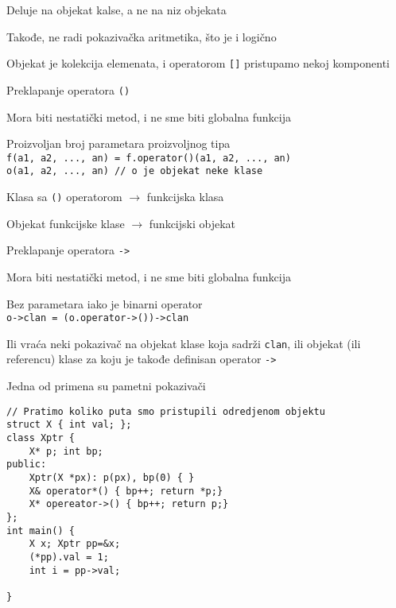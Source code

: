 \documentclass{article}
\newenvironment{xitemize}{%
    
    \itemize
    \larger
}{%
    \enditemize
}
\let\olditemize\itemize
\let\endolditemize\enditemize
\renewenvironment{itemize}{%
    \smaller
    \olditemize
}{%
    \endolditemize
}
\providecommand{\inlinecode}[1]{\texttt{#1}}
\begin{document}
\begin{xitemize}
\begin{itemize}
    \item Deluje na objekat kalse, a ne na niz objekata
    \item Takođe, ne radi pokazivačka aritmetika, što je i logično
    \item Objekat je kolekcija elemenata, i operatorom \inlinecode{[]} pristupamo nekoj komponenti
\end{itemize}
\item Preklapanje operatora \inlinecode{()}
\begin{itemize}
    \item Mora biti nestatički metod, i ne sme biti globalna funkcija
    \item Proizvoljan broj parametara proizvoljnog tipa\\
    \inlinecode{f(a1, a2, ..., an) = f.operator()(a1, a2, ..., an)}\\
    \inlinecode{o(a1, a2, ..., an) // o je objekat neke klase}
    \item Klasa sa \inlinecode{()} operatorom $\rightarrow$ funkcijska klasa
    \item Objekat funkcijske klase $\rightarrow$ funkcijski objekat
\end{itemize}
\item Preklapanje operatora \inlinecode{->}
\begin{itemize}
    \item Mora biti nestatički metod, i ne sme biti globalna funkcija
    \item Bez parametara iako je binarni operator\\
    \inlinecode{o->clan = (o.operator->())->clan}
    \item Ili vraća neki pokazivač na objekat klase koja sadrži \inlinecode{clan}, ili objekat (ili referencu) klase za koju je takođe definisan operator \inlinecode{->}
    \item Jedna od primena su pametni pokazivači
    \begin{lstlisting}
// Pratimo koliko puta smo pristupili odredjenom objektu
struct X { int val; };
class Xptr {
    X* p; int bp;
public:
    Xptr(X *px): p(px), bp(0) { }
    X& operator*() { bp++; return *p;}
    X* opereator->() { bp++; return p;}
};
int main() {
    X x; Xptr pp=&x;
    (*pp).val = 1;
    int i = pp->val;

}
    \end{lstlisting}
\end{itemize}
\end{xitemize}
\end{document}
